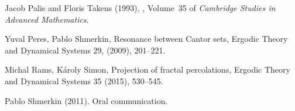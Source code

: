 \documentclass[amssymb,amsfonts,12pt,verbatim,righttag,oneside]{amsart}
\numberwithin{equation}{section} %
\theoremstyle{plain}
\theoremstyle{plain}
\begin{document}
\begin{thebibliography}{13}
 {Jacob Palis and Floris Takens} (1993),
 , Volume~35 of {\em Cambridge Studies in Advanced Mathematics}.

{Yuval Peres, Pablo Shmerkin,}
\newblock Resonance between Cantor sets,
\newblock  Ergodic Theory and Dynamical Systems  29, (2009), 201--221.

{Michal Rams, K{\'a}roly Simon,}
\newblock Projection of fractal percolations,
\newblock Ergodic Theory and Dynamical Systems 35 (2015),   {530--545}.

{ Pablo Shmerkin} (2011).
\newblock Oral communication.

\end{thebibliography}
\end{document}

